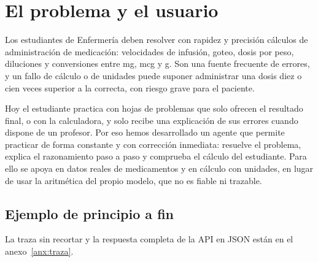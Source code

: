 \section{El problema y el usuario}

Los estudiantes de Enfermería deben resolver con rapidez y precisión cálculos de administración de medicación: velocidades de infusión, goteo, dosis por peso, diluciones y conversiones entre mg, mcg y g. Son una fuente frecuente de errores, y un fallo de cálculo o de unidades puede suponer administrar una dosis diez o cien veces superior a la correcta, con riesgo grave para el paciente.

Hoy el estudiante practica con hojas de problemas que solo ofrecen el resultado final, o con la calculadora, y solo recibe una explicación de sus errores cuando dispone de un profesor. Por eso hemos desarrollado un agente que permite practicar de forma constante y con corrección inmediata: resuelve el problema, explica el razonamiento paso a paso y comprueba el cálculo del estudiante. Para ello se apoya en datos reales de medicamentos y en cálculo con unidades, en lugar de usar la aritmética del propio modelo, que no es fiable ni trazable.

\subsection*{Ejemplo de principio a fin}

{\renewcommand{\cajapad}{5pt}\renewcommand{\cajapadv}{2pt}
}


La traza sin recortar y la respuesta completa de la API en JSON están en el anexo~\ref{anx:traza}.
